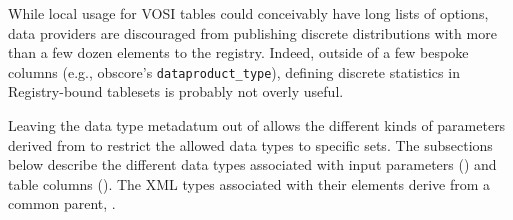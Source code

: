 \documentclass[11pt,a4paper]{ivoa}
\begin{document}
\begin{generated}
\begin{bigdescription}
\end{bigdescription}\endgroup

\endgroup
\end{generated}


While local usage for VOSI tables could conceivably have long lists of
options, data providers are discouraged from publishing discrete
distributions with more than a few dozen elements to the
registry.  Indeed, outside of a few bespoke columns (e.g., obscore's
\verb|dataproduct_type|), defining discrete statistics in Registry-bound
tablesets is probably not overly useful.

Leaving the data type metadatum out of 
allows the different kinds of parameters derived from
 to restrict the allowed data types to
specific sets.  The subsections below describe the different data
types associated with input parameters
() and table
columns ().  The
XML types associated with their  elements
derive from a common parent, .
\end{document}
